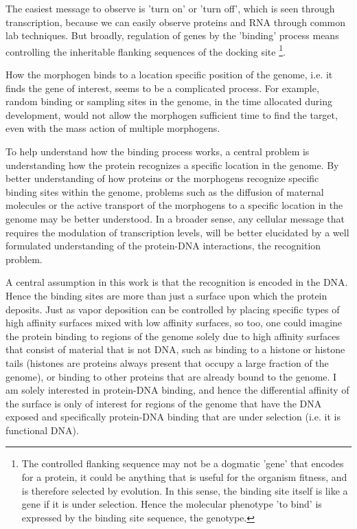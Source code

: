   The easiest message to observe is 'turn on' or 'turn off', which is seen through transcription, because we can easily observe proteins and RNA through common lab techniques. But broadly, regulation of genes by the 'binding' process means controlling the inheritable flanking sequences of the docking site \footnote{The controlled flanking sequence may not be a dogmatic 'gene' that encodes for a protein, it could be anything that is useful for the organism fitness, and is therefore selected by evolution.  In this sense, the binding site itself is like a gene if it is under selection.  Hence the molecular phenotype 'to bind' is expressed by the binding site sequence, the genotype.  }.
  
  How the morphogen binds to a location specific position of the genome, i.e. it finds the gene of interest, seems to be a complicated process.  For example, random binding or sampling sites in the genome, in the time allocated during development, would not allow the morphogen sufficient time to find the target, even with the mass action of multiple morphogens.  
  
  To help understand how the binding process works, a central problem is understanding how the protein recognizes a specific location in the genome.  By better understanding of how proteins or the morphogens recognize specific binding sites within the genome, problems such as the diffusion of maternal molecules or the active transport of the morphogens to a specific location in the genome may be better understood.  In a broader sense, any cellular message that requires the modulation of transcription levels, will be better elucidated by a well formulated understanding of the protein-DNA interactions, the recognition problem.
   
   A central assumption in this work is that the recognition is encoded in the DNA.  Hence the binding sites are more than just a surface upon which the protein deposits.  Just as vapor deposition can be controlled by placing specific types of high affinity surfaces mixed with low affinity surfaces, so too, one could imagine the protein binding to regions of the genome solely due to high affinity surfaces that consist of material that is not DNA, such as binding to a histone or histone tails (histones are proteins always present that occupy a large fraction of the genome), or binding to other proteins that are already bound to the genome.  I am solely interested in protein-DNA binding, and hence the differential affinity of the surface is only of interest for regions of the genome that have the DNA exposed and specifically protein-DNA binding that are under selection (i.e. it is functional DNA).  
   
